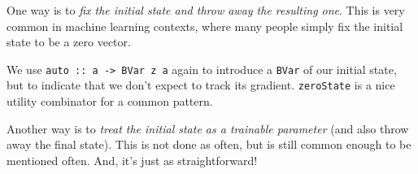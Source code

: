 \documentclass[]{article}
\newenvironment{Shaded}{}{}
\newcommand{\CommentTok}[1]{\textcolor[rgb]{0.38,0.63,0.69}{\textit{#1}}}
\newcommand{\DataTypeTok}[1]{\textcolor[rgb]{0.56,0.13,0.00}{#1}}
\newcommand{\DecValTok}[1]{\textcolor[rgb]{0.25,0.63,0.44}{#1}}
\newcommand{\FunctionTok}[1]{\textcolor[rgb]{0.02,0.16,0.49}{#1}}
\newcommand{\KeywordTok}[1]{\textcolor[rgb]{0.00,0.44,0.13}{\textbf{#1}}}
\newcommand{\NormalTok}[1]{#1}
\newcommand{\OtherTok}[1]{\textcolor[rgb]{0.00,0.44,0.13}{#1}}
\begin{document}
One way is to \emph{fix the initial state and throw away the resulting one}.
This is very common in machine learning contexts, where many people simply fix
the initial state to be a zero vector.

\begin{Shaded}
\end{Shaded}

We use \texttt{auto\ ::\ a\ -\textgreater{}\ BVar\ z\ a} again to introduce a
\texttt{BVar} of our initial state, but to indicate that we don't expect to
track its gradient. \texttt{zeroState} is a nice utility combinator for a common
pattern.

Another way is to \emph{treat the initial state as a trainable parameter} (and
also throw away the final state). This is not done as often, but is still common
enough to be mentioned often. And, it's just as straightforward!

\begin{Shaded}
\end{Shaded}
\end{document}
